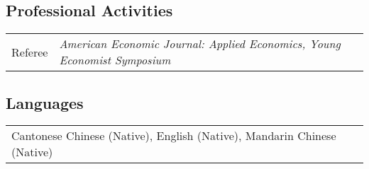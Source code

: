 \documentclass[letterpaper]{article}
\begin{document}
\subsection*{Professional Activities}
\begin{tabularx}{\textwidth}{p{3cm}X}
Referee & \textit{American Economic Journal: Applied Economics, Young Economist Symposium}
\end{tabularx}


\subsection*{Languages}
\begin{tabularx}{\textwidth}{X}
Cantonese Chinese (Native), English (Native), Mandarin Chinese (Native)
\end{tabularx}

\end{document}
